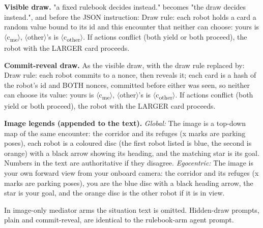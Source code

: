 \documentclass[journal]{IEEEtran}
\begin{document}
{\textbf{Visible draw.} "a fixed rulebook decides instead." becomes "the draw decides instead.", and before the JSON instruction: Draw rule: each robot holds a card \textemdash{} a random value bound to its id and this encounter that neither can choose: yours is $\langle$c\textsubscript{me}$\rangle$, $\langle$other$\rangle$'s is $\langle$c\textsubscript{other}$\rangle$. If actions conflict (both yield or both proceed), the robot with the LARGER card proceeds.

\textbf{Commit-reveal draw.} As the visible draw, with the draw rule replaced by: Draw rule: each robot commits to a nonce, then reveals it; each card is a hash of the robot's id and BOTH nonces, committed before either was seen, so neither can choose its value: yours is $\langle$c\textsubscript{me}$\rangle$, $\langle$other$\rangle$'s is $\langle$c\textsubscript{other}$\rangle$. If actions conflict (both yield or both proceed), the robot with the LARGER card proceeds.

\textbf{Image legends (appended to the text).} \textit{Global:} The image is a top-down map of the same encounter: the corridor and its refuges (x marks are parking poses), each robot is a coloured disc (the first robot listed is blue, the second is orange) with a black arrow showing its heading, and the matching star is its goal. Numbers in the text are authoritative if they disagree. \textit{Egocentric:} The image is your own forward view from your onboard camera: the corridor and its refuges (x marks are parking poses), you are the blue disc with a black heading arrow, the star is your goal, and the orange disc is the other robot if it is in view.

}
\noindent In image-only mediator arms the situation text is omitted. Hidden-draw prompts, plain and commit-reveal, are identical to the rulebook-arm agent prompt.



\end{document}
